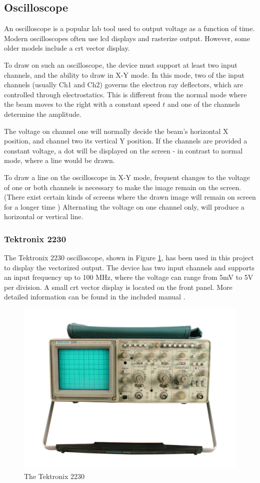 \subsection{Oscilloscope}
An oscilloscope is a popular lab tool used to output voltage as a function of time.
Modern oscilloscopes often use \gls{lcd} displays and rasterize output.
However, some older models include a \gls{crt} vector display.

To draw on such an oscilloscope, the device must support at least two input channels, and the ability to draw in X-Y mode.
In this mode, two of the input channels (usually Ch1 and Ch2) governs the electron ray deflectors, which are controlled through electrostatics.
This is different from the normal mode where the beam moves to the right with a constant speed \( t \) and one of the channels determine the amplitude.

The voltage on channel one will normally decide the beam's horizontal X position, and channel two its vertical Y position.
If the channels are provided a constant voltage, a dot will be displayed on the screen - in contrast to normal mode, where a line would be drawn.

To draw a line on the oscilloscope in X-Y mode, frequent changes to the voltage of one or both channels is necessary to make the image remain on the screen.
(There exist certain kinds of screens where the drawn image will remain on screen for a longer time \cite{tektronix4010})
Alternating the voltage on one channel only, will produce a horizontal or vertical line.

\subsubsection{Tektronix 2230}
The Tektronix 2230 oscilloscope, shown in Figure \ref{fig:oscilloscope}, has been used in this project to display the vectorized output.
The device has two input channels and supports an input frequency up to 100 MHz, where the voltage can range from 5mV to 5V per division.
A small \gls{crt} vector display is located on the front panel.
More detailed information can be found in the included manual \cite{tektronix2230}.

\begin{figure}[h!]
	\centering
	\includegraphics[width=0.6\linewidth]{images/oscilloscope.jpg}
    \caption{The Tektronix 2230 \cite{oscilloscope}}
    \label{fig:oscilloscope}
\end{figure}
